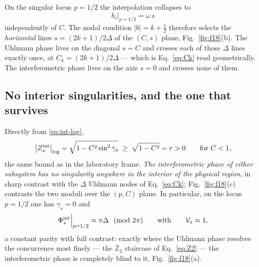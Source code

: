 \documentclass[11pt]{article}
\begin{document}
On the singular locus $p=1/2$ the interpolation collapses to
\begin{equation}
\boxed{\;b_s\big|_{p=1/2}=\omega\,s\;}
\label{eq:bs-half}
\end{equation}
independently of $C$. The nodal condition $|b|=k+\tfrac12$ therefore
selects the \emph{horizontal} lines $s=(2k+1)/2\Delta$ of the $(C,s)$ plane,
Fig.~\ref{fig:f18}(b). The Uhlmann phase lives on the diagonal $s=C$ and
crosses each of those $\Delta$ lines exactly once, at
$C_k=(2k+1)/2\Delta$ --- which is Eq.~\eqref{eq:Ck} read geometrically. The
interferometric phase lives on the axis $s=0$ and crosses none of them.

\subsection{No interior singularities, and the one that survives}

Directly from \eqref{eq:int-log},
\begin{equation}
\big|Z^{\rm int}_s\big|_{\rm log}
=\sqrt{1-C^2\sin^2\gamma_s}\;\geq\;\sqrt{1-C^2}=r>0
\qquad\text{for } C<1 ,
\label{eq:no-nodes}
\end{equation}
the same bound as in the laboratory frame. \emph{The interferometric phase of
either subsystem has no singularity anywhere in the interior of the physical
region}, in sharp contrast with the $\Delta$ Uhlmann nodes of
Eq.~\eqref{eq:Ck}; Fig.~\ref{fig:f18}(c) contrasts the two moduli over the
$(p,C)$ plane. In particular, on the locus $p=1/2$ one has $\gamma_s=0$ and
\begin{equation}
\Phi^{\rm int}_s\Big|_{p=1/2}=\pi\Delta \ \ (\mathrm{mod}\ 2\pi)
\qquad\text{with}\qquad \mathcal V_s=1 ,
\label{eq:int-half}
\end{equation}
a constant parity with full contrast: exactly where the Uhlmann phase resolves
the concurrence most finely --- the $\mathbb Z_2$ staircase of
Eq.~\eqref{eq:Z2} --- the interferometric phase is completely blind to it,
Fig.~\ref{fig:f18}(a).
\end{document}
